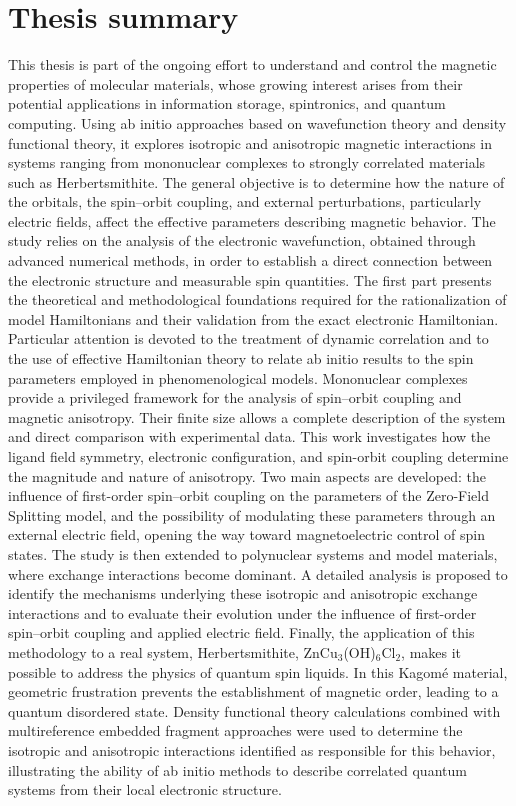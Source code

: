 \documentclass[12pt,a4paper]{report}
\numberwithin{equation}{section}
\begin{document}
\chapter*{Thesis summary}
This thesis is part of the ongoing effort to understand and control the magnetic properties of molecular materials, whose growing interest arises from their potential applications in information storage, spintronics, and quantum computing. Using ab initio approaches based on wavefunction theory and density functional theory, it explores isotropic and anisotropic magnetic interactions in systems ranging from mononuclear complexes to strongly correlated materials such as Herbertsmithite.
The general objective is to determine how the nature of the orbitals, the spin–orbit coupling, and external perturbations, particularly electric fields, affect the effective parameters describing magnetic behavior. The study relies on the analysis of the electronic wavefunction, obtained through advanced numerical methods, in order to establish a direct connection between the electronic structure and measurable spin quantities.
The first part presents the theoretical and methodological foundations required for the rationalization of model Hamiltonians and their validation from the exact electronic Hamiltonian. Particular attention is devoted to the treatment of dynamic correlation and to the use of effective Hamiltonian theory to relate ab initio results to the spin parameters employed in phenomenological models.
Mononuclear complexes provide a privileged framework for the analysis of spin–orbit coupling and magnetic anisotropy. Their finite size allows a complete description of the system and direct comparison with experimental data. This work investigates how the ligand field symmetry, electronic configuration, and spin-orbit coupling determine the magnitude and nature of anisotropy. Two main aspects are developed: the influence of first-order spin–orbit coupling on the parameters of the Zero-Field Splitting model, and the possibility of modulating these parameters through an external electric field, opening the way toward magnetoelectric control of spin states.
The study is then extended to polynuclear systems and model materials, where exchange interactions become dominant. A detailed analysis is proposed to identify the mechanisms underlying these isotropic and anisotropic exchange interactions and to evaluate their evolution under the influence of first-order spin–orbit coupling and applied electric field.
Finally, the application of this methodology to a real system, Herbertsmithite, ZnCu$_3$(OH)$_6$Cl$_2$, makes it possible to address the physics of quantum spin liquids. In this Kagomé material, geometric frustration prevents the establishment of magnetic order, leading to a quantum disordered state. Density functional theory calculations combined with multireference embedded fragment approaches were used to determine the isotropic and anisotropic interactions identified as responsible for this behavior, illustrating the ability of ab initio methods to describe correlated quantum systems from their local electronic structure.
\end{document}
